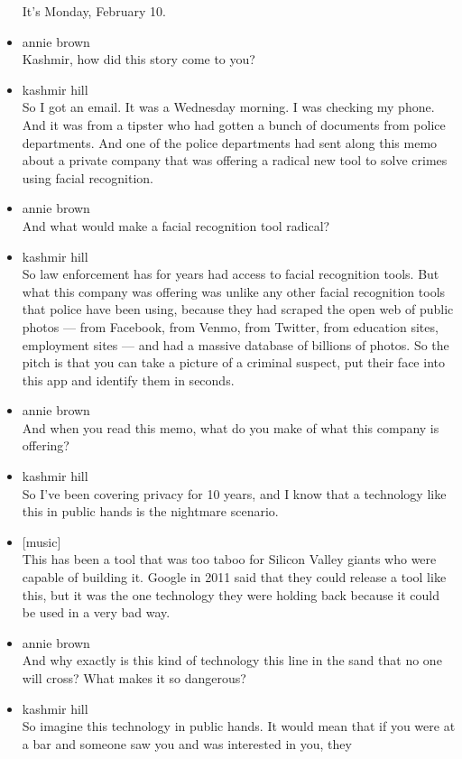 \begin{itemize}
  It's Monday, February 10.
\item
  annie brown\\
  Kashmir, how did this story come to you?
\item
  kashmir hill\\
  So I got an email. It was a Wednesday morning. I was checking my
  phone. And it was from a tipster who had gotten a bunch of documents
  from police departments. And one of the police departments had sent
  along this memo about a private company that was offering a radical
  new tool to solve crimes using facial recognition.
\item
  annie brown\\
  And what would make a facial recognition tool radical?
\item
  kashmir hill\\
  So law enforcement has for years had access to facial recognition
  tools. But what this company was offering was unlike any other facial
  recognition tools that police have been using, because they had
  scraped the open web of public photos --- from Facebook, from Venmo,
  from Twitter, from education sites, employment sites --- and had a
  massive database of billions of photos. So the pitch is that you can
  take a picture of a criminal suspect, put their face into this app and
  identify them in seconds.
\item
  annie brown\\
  And when you read this memo, what do you make of what this company is
  offering?
\item
  kashmir hill\\
  So I've been covering privacy for 10 years, and I know that a
  technology like this in public hands is the nightmare scenario.
\item
  {[}music{]}\\
  This has been a tool that was too taboo for Silicon Valley giants who
  were capable of building it. Google in 2011 said that they could
  release a tool like this, but it was the one technology they were
  holding back because it could be used in a very bad way.
\item
  annie brown\\
  And why exactly is this kind of technology this line in the sand that
  no one will cross? What makes it so dangerous?
\item
  kashmir hill\\
  So imagine this technology in public hands. It would mean that if you
  were at a bar and someone saw you and was interested in you, they

\end{itemize}
